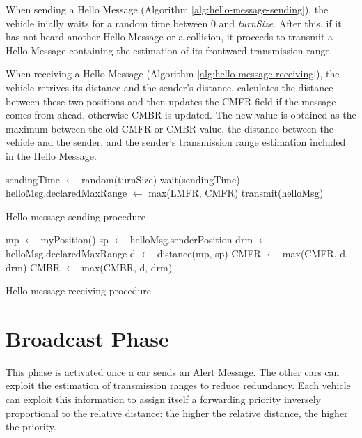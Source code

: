 		When sending a Hello Message (Algorithm \ref{alg:hello-message-sending}), the vehicle inially waits for a random time between 0 and \textit{turnSize}. After this, if it has not heard another Hello Message or a collision, it proceeds to transmit a Hello Message containing the estimation of its frontward transmission range.
		
		
		When receiving a Hello Message (Algorithm \ref{alg:hello-message-receiving}), the vehicle retrives its distance and the sender's distance, calculates the distance between these two positions and then updates the CMFR field if the message comes from ahead, otherwise CMBR is updated. The new value is obtained as the maximum between the old CMFR or CMBR value, the distance between the vehicle and the sender, and the sender's transmission range estimation included in the Hello Message.
		
		\begin{algorithm}[H]
			\begin{algorithmic}[1]
					\State sendingTime $\gets$ random(turnSize)
					\State wait(sendingTime)
						\State helloMsg.declaredMaxRange $\gets$ max(LMFR, CMFR)
						\State transmit(helloMsg)
					\EndIf
				\EndFor
			\end{algorithmic}
			\caption{Hello message sending procedure}
			\label{alg:hello-message-sending}
		\end{algorithm}
		
		\begin{algorithm}[H]
			\begin{algorithmic}[1]
				\State mp $\gets$ myPosition()
				\State sp $\gets$ helloMsg.senderPosition
				\State drm $\gets$ helloMsg.declaredMaxRange
				\State d $\gets$ distance(mp, sp)
				\State CMFR $\gets$ max(CMFR, d, drm)
				\Else
				\State CMBR $\gets$ max(CMBR, d, drm)
				\EndIf
			\end{algorithmic}
			\caption{Hello message receiving procedure}
			\label{alg:hello-message-receiving}
		\end{algorithm}
	
	\section{Broadcast Phase}
		This phase is activated once a car sends an Alert Message. The other cars can exploit the estimation of transmission ranges to reduce redundancy. Each vehicle can exploit this information to assign itself a forwarding priority inversely proportional to the relative distance: the higher the relative distance, the higher the priority.  
		
